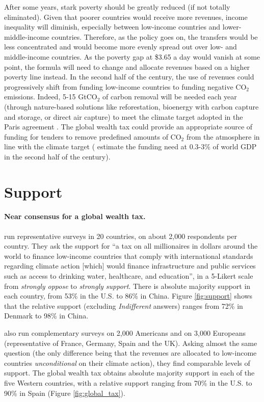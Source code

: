 \documentclass[12pt,english]{article}
\begin{document}
After some years, stark poverty should be greatly reduced (if not totally eliminated). Given that poorer countries would receive more revenues, income inequality will diminish, especially between low-income countries and lower-middle-income countries. Therefore, as the policy goes on, the transfers would be less concentrated and would become more evenly spread out over low- and middle-income countries. As the poverty gap at \$3.65 a day would vanish at some point, the formula will need to change and allocate revenues based on a higher poverty line instead. In the second half of the century, the use of revenues could progressively shift from funding low-income countries to funding negative CO$_\text{2}$ emissions. Indeed, 5-15 GtCO$_\text{2}$ of carbon removal will be needed each year (through nature-based solutions like reforestation, bioenergy with carbon capture and storage, or direct air capture) to meet the climate target adopted in the Paris agreement \citep{ipcc_wgiii_2022}. The global wealth tax could provide an appropriate source of funding for tenders to remove predefined amounts of CO$_\text{2}$ from the atmosphere in line with the climate target (\citet{edenhofer_governance_2023} estimate the funding need at 0.3-3\% of world GDP in the second half of the century). 

\section{Support}\label{sec:support}

\paragraph{Near consensus for a global wealth tax.} \citet{fabre_international_2023} run representative surveys in 20 countries, on about 2,000 respondents per country. They ask the support for
``a tax on all millionaires in dollars around the world to finance low-income countries that comply with international standards regarding climate action [which] would finance infrastructure and public services such as access to drinking water, healthcare, and education'', in a 5-Likert scale from \textit{strongly oppose} to \textit{strongly support}. There is absolute majority support in each country, from 53\% in the U.S. to 86\% in China. Figure \ref{fig:support} shows that the relative support (excluding \textit{Indifferent} answers) ranges from 72\% in Denmark to 98\% in China. 


\citet{fabre_international_2023} also run complementary surveys on 2,000 Americans and on 3,000 Europeans (representative of France, Germany, Spain and the UK). Asking almost the same question (the only difference being that the revenues are allocated to low-income countries \textit{unconditional} on their climate action), they find comparable levels of support. The global wealth tax obtains absolute majority support in each of the five Western countries, with a relative support ranging from 70\% in the U.S. to 90\% in Spain (Figure \ref{fig:global_tax}). %
\end{document}
